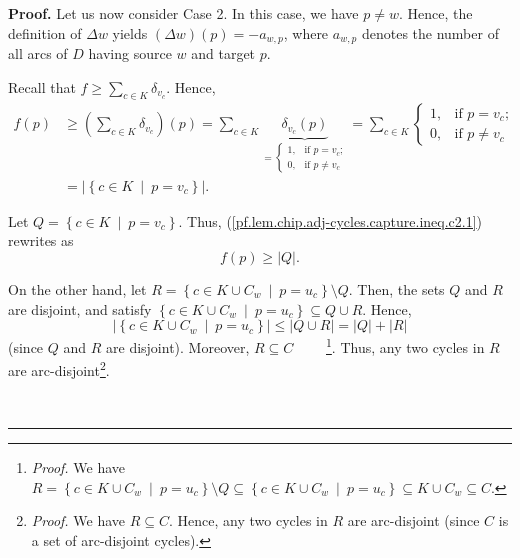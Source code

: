 \documentclass[numbers=enddot,12pt,final,onecolumn,notitlepage]{scrartcl}%
\theoremstyle{definition}
\newenvironment{proof}[1][Proof]{\noindent\textbf{#1.} }{\ \rule{0.5em}{0.5em}}
\let\sumnonlimits\sum
\renewcommand{\sum}{\sumnonlimits\limits}
\begin{document}
\begin{proof}
Let us now consider Case 2. In this case, we have $p\neq w$. Hence, the
definition of $\Delta w$ yields $\left(  \Delta w\right)  \left(  p\right)
=-a_{w,p}$, where $a_{w,p}$ denotes the number of all arcs of $D$ having
source $w$ and target $p$.

Recall that $f\geq\sum_{c\in K}\delta_{v_{c}}$. Hence,%
\begin{align}
f\left(  p\right)    & \geq\left(  \sum_{c\in K}\delta_{v_{c}}\right)  \left(
p\right)  =\sum_{c\in K}\underbrace{\delta_{v_{c}}\left(  p\right)  }_{=%
\begin{cases}
1, & \text{if }p=v_{c};\\
0, & \text{if }p\neq v_{c}%
\end{cases}
}=\sum_{c\in K}%
\begin{cases}
1, & \text{if }p=v_{c};\\
0, & \text{if }p\neq v_{c}%
\end{cases}
\nonumber\\
& =\left\vert \left\{  c\in K\ \mid\ p=v_{c}\right\}  \right\vert
.\label{pf.lem.chip.adj-cycles.capture.ineq.c2.1}%
\end{align}


Let $Q=\left\{  c\in K\ \mid\ p=v_{c}\right\}  $. Thus,
(\ref{pf.lem.chip.adj-cycles.capture.ineq.c2.1}) rewrites as
\begin{equation}
f\left(  p\right)  \geq\left\vert Q\right\vert
.\label{pf.lem.chip.adj-cycles.capture.ineq.c2.1b}%
\end{equation}


On the other hand, let $R=\left\{  c\in K\cup C_{w}\ \mid\ p=u_{c}\right\}
\setminus Q$. Then, the sets $Q$ and $R$ are disjoint, and satisfy $\left\{
c\in K\cup C_{w}\ \mid\ p=u_{c}\right\}  \subseteq Q\cup R$. Hence,%
\begin{equation}
\left\vert \left\{  c\in K\cup C_{w}\ \mid\ p=u_{c}\right\}  \right\vert
\leq\left\vert Q\cup R\right\vert =\left\vert Q\right\vert +\left\vert
R\right\vert \label{pf.lem.chip.adj-cycles.capture.ineq.c2.4}%
\end{equation}
(since $Q$ and $R$ are disjoint). Moreover, $R\subseteq C$%
\ \ \ \ \footnote{\textit{Proof.} We have $R=\left\{  c\in K\cup C_{w}%
\ \mid\ p=u_{c}\right\}  \setminus Q\subseteq\left\{  c\in K\cup C_{w}%
\ \mid\ p=u_{c}\right\}  \subseteq K\cup C_{w}\subseteq C$.}. Thus, any two
cycles in $R$ are arc-disjoint\footnote{\textit{Proof.} We have $R\subseteq
C$. Hence, any two cycles in $R$ are arc-disjoint (since $C$ is a set of
arc-disjoint cycles).}.


\end{proof}
\end{document}
